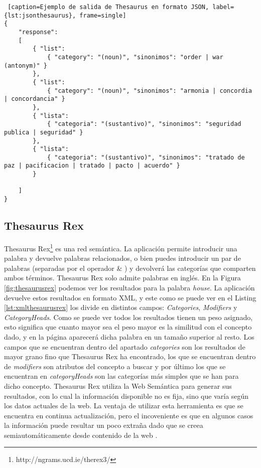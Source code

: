 
\begin{lstlisting} [caption=Ejemplo de salida de Thesaurus en formato JSON, label={lst:jsonthesaurus}, frame=single]
{
	"response":
	[
		{ "list": 
			{ "category": "(noun)", "sinonimos": "order | war (antonym)" }
		},
		{ "list": 
			{ "category": "(noun)", "sinonimos": "armonia | concordia | concordancia" }
		},
		{ "lista": 
			{ "categoria": "(sustantivo)", "sinonimos": "seguridad publica | seguridad" }
		},
		{ "lista": 
			{ "categoria": "(sustantivo)", "sinonimos": "tratado de paz | pacificacion | tratado | pacto | acuerdo" }
		}
	
	]
}
\end{lstlisting}




\subsection{Thesaurus Rex}
\label{cap:subsec:thesaurusrex}

Thesaurus Rex\footnote{http://ngrams.ucd.ie/therex3/} es una red semántica. La aplicación permite introducir una palabra y devuelve palabras relacionados, o bien puedes introducir un par de palabras (separadas por el operador  \& ) y devolverá las categorías que comparten ambos términos.
Thesaurus Rex solo admite palabras en inglés. En la Figura \ref{fig:thesaurusrex} podemos ver los resultados para la palabra  \textit{house}.
La aplicación devuelve estos resultados en formato XML, y este como se puede ver en el Listing \ref{lst:xmlthesaurusrex} los divide en distintos campos: \textit{Categories}, \textit{Modifiers} y \textit{CategoryHeads}. Como se puede ver todos los resultados tienen un peso asignado, esto significa que cuanto mayor sea el peso mayor es la similitud con el concepto dado, y en la página aparecerá dicha palabra en un tamaño superior al resto.
Los campos que se encuentran dentro del apartado \textit{categories} son los resultados de mayor grano fino que Thesaurus Rex ha encontrado, los que se encuentran dentro de  \textit{modifiers} son atributos del concepto a buscar y por último los que se encuentran en \textit{categoryHeads} son las categorías más simples que se han para dicho concepto.
Thesaurus Rex utiliza la Web Semántica para generar sus resultados, con lo cual la información disponible no es fija, sino que varía según los datos actuales de la web.
La ventaja de utilizar esta herramienta es que se encuentra en continua actualización, pero el incoveniente es que en algunos casos la información puede resultar un poco extraña dado que se creea semiautomáticamente desde contenido de la web \citep{TFMPaloma}.

